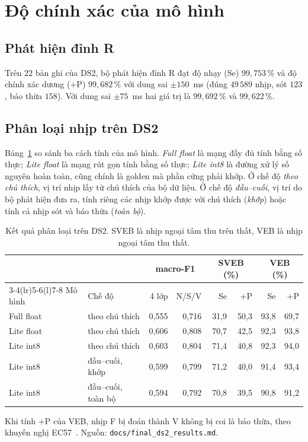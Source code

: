 \section{Độ chính xác của mô hình}\label{sec:dochinhxac}
\subsection{Phát hiện đỉnh R}
Trên $22$ bản ghi của DS2, bộ phát hiện đỉnh R đạt độ nhạy (Se) $99{,}753\,\%$ và độ chính xác dương (+P) $99{,}682\,\%$ với dung sai $\pm150$~ms (đúng $49\,589$ nhịp, sót $123$, báo thừa $158$).
Với dung sai $\pm75$~ms hai giá trị là $99{,}692\,\%$ và $99{,}622\,\%$.

\subsection{Phân loại nhịp trên DS2}
Bảng~\ref{tab:ds2} so sánh ba cách tính của mô hình.
\emph{Full float} là mạng đầy đủ tính bằng số thực; \emph{Lite float} là mạng rút gọn tính bằng số thực; \emph{Lite int8} là đường xử lý số nguyên hoàn toàn, cũng chính là golden mà phần cứng phải khớp.
Ở chế độ \emph{theo chú thích}, vị trí nhịp lấy từ chú thích của bộ dữ liệu.
Ở chế độ \emph{đầu--cuối}, vị trí do bộ phát hiện đưa ra, tính riêng các nhịp khớp được với chú thích (\emph{khớp}) hoặc tính cả nhịp sót và báo thừa (\emph{toàn bộ}).

\begin{table}[htbp]\centering
\caption{Kết quả phân loại trên DS2. SVEB là nhịp ngoại tâm thu trên thất, VEB là nhịp ngoại tâm thu thất.}\label{tab:ds2}
\small\setlength{\tabcolsep}{4pt}
\begin{tabular}{@{}llrrrrrr@{}}
\toprule
 & & \multicolumn{2}{c}{macro-F1} & \multicolumn{2}{c}{SVEB (\%)} & \multicolumn{2}{c}{VEB (\%)} \\ \cmidrule(lr){3-4}\cmidrule(lr){5-6}\cmidrule(l){7-8}
Mô hình & Chế độ & 4 lớp & N/S/V & Se & +P & Se & +P \\ \midrule
Full float & theo chú thích & 0{,}555 & 0{,}716 & 31{,}9 & 50{,}3 & 93{,}8 & 69{,}7 \\
Lite float & theo chú thích & 0{,}606 & 0{,}808 & 70{,}7 & 42{,}5 & 92{,}3 & 93{,}8 \\
Lite int8  & theo chú thích & 0{,}603 & 0{,}804 & 71{,}4 & 40{,}8 & 92{,}3 & 94{,}0 \\
Lite int8  & đầu--cuối, khớp & 0{,}599 & 0{,}799 & 71{,}2 & 40{,}0 & 91{,}4 & 93{,}4 \\
Lite int8  & đầu--cuối, toàn bộ & 0{,}594 & 0{,}792 & 70{,}8 & 39{,}5 & 90{,}8 & 91{,}2 \\ \bottomrule
\end{tabular}

\smallskip
\footnotesize Khi tính +P của VEB, nhịp F bị đoán thành V không bị coi là báo thừa, theo khuyến nghị EC57~\cite{aami2012ec57}. Nguồn: \texttt{docs/final\_ds2\_results.md}.
\end{table}

